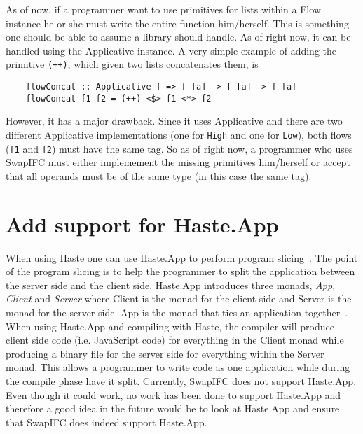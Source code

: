As of now, if a programmer want to use primitives for lists within a Flow instance he or she must write the entire function him/herself. This is something one should be able to assume a library should handle. As of right now, it can be handled using the Applicative instance. A very simple example of adding the primitive {\tt (++)}, which given two lists concatenates them, is
\begin{verbatim}
    flowConcat :: Applicative f => f [a] -> f [a] -> f [a]
    flowConcat f1 f2 = (++) <$> f1 <*> f2
\end{verbatim}
However, it has a major drawback. Since it uses Applicative and there are two different Applicative implementations (one for {\tt High} and one for {\tt Low}), both flows ({\tt f1} and {\tt f2}) must have the same tag. So as of right now, a programmer who uses SwapIFC must either implemement the missing primitives him/herself or accept that all operands must be of the same type (in this case the same tag).

\section{Add support for Haste.App}
\label{chapter:future-haste-app}
When using Haste one can use Haste.App to perform program slicing~\cite{haste-symposium}. The point of the program slicing is to help the programmer to split the application between the server side and the client side. Haste.App introduces three monads, \emph{App}, \emph{Client} and \emph{Server} where Client is the monad for the client side and Server is the monad for the server side. App is the monad that ties an application together~\cite{haste-app}. When using Haste.App and compiling with Haste, the compiler will produce client side code (i.e. JavaScript code) for everything in the Client monad while producing a binary file for the server side for everything within the Server monad. This allows a programmer to write code as one application while during the compile phase have it split. Currently, SwapIFC does not support Haste.App. Even though it could work, no work has been done to support Haste.App and therefore a good idea in the future would be to look at Haste.App and ensure that SwapIFC does indeed support Haste.App.

